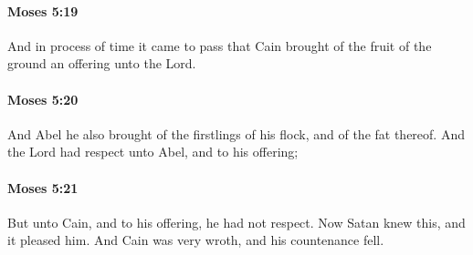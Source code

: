 		\paragraph{Moses 5:19} %
			\label{MOSES-5-19}

			And in process of time it came to pass that Cain brought of the fruit of the ground an offering unto the Lord.


		\paragraph{Moses 5:20} %
			\label{MOSES-5-20}

			And Abel he also brought of the firstlings of his flock, and of the fat thereof. And the Lord had respect unto Abel, and to his offering;


		\paragraph{Moses 5:21} %
			\label{MOSES-5-21}

			But unto Cain, and to his offering, he had not respect. Now Satan knew this, and it pleased him. And Cain was very wroth, and his countenance fell.



